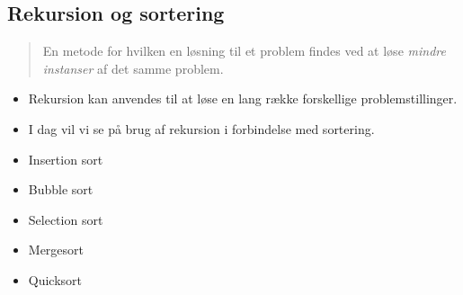 \documentclass[rgb]{beamer}
\begin{document}
\popmaketitleframe

\subsection{Rekursion og sortering}

\begin{frame}[fragile]
\begin{footnotesize}


  \begin{quote}
    En metode for hvilken en løsning til et problem findes ved at løse
    \emph{mindre instanser} af det samme problem.
  \end{quote}

  \begin{itemize}
  \item Rekursion kan anvendes til at løse en lang række forskellige problemstillinger.

  \item I dag vil vi se på brug af rekursion i forbindelse med sortering.
  \end{itemize}

  \begin{minipage}[b]{0.6\textwidth}
  \begin{itemize}
  \item Insertion sort
  \item Bubble sort
  \item Selection sort
  \item Mergesort
  \item Quicksort
  \end{itemize}
\end{minipage}  \begin{minipage}[b]{0.3\textwidth}


\end{minipage}
\end{footnotesize}
\end{frame}
\end{document}
